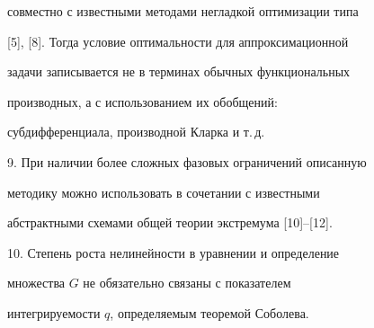 совместно с известными методами негладкой оптимизации типа 


[5], [8]. Тогда условие оптимальности для аппроксимационной 


задачи записывается не в терминах обычных функциональных 


производных, а с использованием их обобщений: 


субдифференциала, производной Кларка и т.\,д. 


 


9. При наличии более сложных фазовых ограничений описанную 


методику можно использовать в сочетании с известными 


абстрактными схемами общей теории экстремума [10]--[12]. 


 


10. Степень роста нелинейности в уравнении и определение 


множества $G$ не обязательно связаны с показателем 


интегрируемости $q$, определяемым теоремой Соболева. 


 


 


